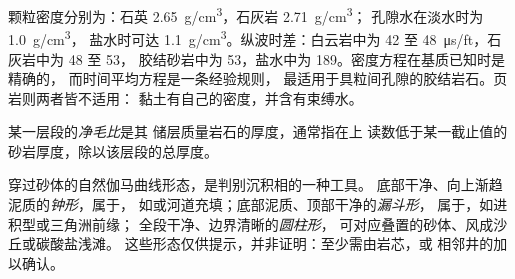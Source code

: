颗粒密度分别为：石英 \qty{2.65}{g/cm^3}，石灰岩 \qty{2.71}{g/cm^3}；
孔隙水在淡水时为 \qty{1.0}{g/cm^3}，
盐水时可达 \qty{1.1}{g/cm^3}。纵波时差：白云岩中为 42 至
\qty{48}{\micro\second/ft}，石灰岩中为 48 至 53，
胶结砂岩中为 53，盐水中为 189。密度方程在基质已知时是精确的，
而时间平均方程是一条经验规则，
最适用于具粒间孔隙的胶结岩石。页岩则两者皆不适用：
黏土有自己的密度，并含有束缚水。

\begin{definition}[净毛比]\label{def:b3:facies-models:ntg}
某一层段的\emph{净毛比}是其
储层质量岩石的厚度，通常指在上
读数低于某一截止值的砂岩厚度，除以该层段的总厚度。
\end{definition}

穿过砂体的自然伽马曲线形态，是判别沉积相的一种工具。
底部干净、向上渐趋泥质的\emph{钟形}，属于，
如或河道充填；底部泥质、顶部干净的\emph{漏斗形}，
属于，如进积型或三角洲前缘；
全段干净、边界清晰的\emph{圆柱形}，
可对应叠置的砂体、风成沙丘或碳酸盐浅滩。
这些形态仅供提示，并非证明：至少需由岩芯，或
相邻井的加以确认。

